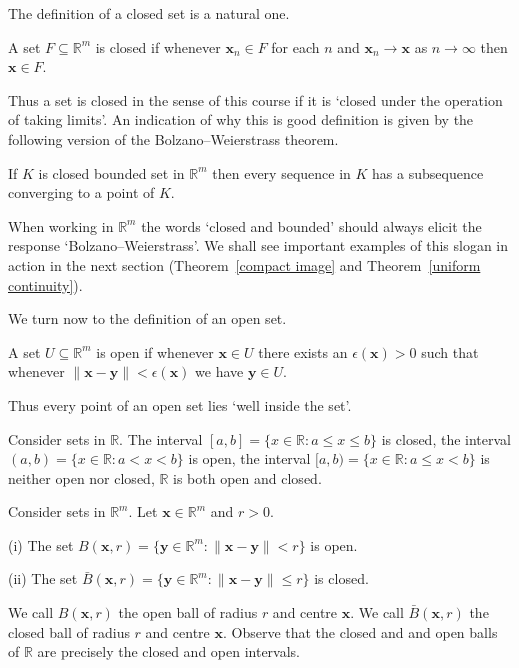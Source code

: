 The definition of a closed set is a natural one.
\begin{definition} A set $F\subseteq{\mathbb R}^{m}$
is closed if whenever $\mathbf{x}_{n}\in F$ for each
$n$ and $\mathbf{x}_{n}\rightarrow \mathbf{x}$
as $n\rightarrow\infty$ then $\mathbf{x}\in F$.
\end{definition}
Thus a set is closed in the sense of this course if
it is `closed under the operation of taking limits'.
An indication of why this is good definition is given
by the following version of the Bolzano--Weierstrass
theorem.
\begin{theorem} If $K$ is closed bounded set in
${\mathbb R}^{m}$ then every sequence in $K$ has
a subsequence converging to a point of $K$.
\end{theorem}
When working in ${\mathbb R}^{m}$ the words
`closed and bounded' should always elicit
the response `Bolzano--Weierstrass'. We shall
see important examples of this slogan in action
in the next section (Theorem~\ref{compact image}
and Theorem~\ref{uniform continuity}).

We turn now to the definition of an open set.
\begin{definition} A set $U\subseteq{\mathbb R}^{m}$
is open if whenever $\mathbf{x}\in U$ there exists
an $\epsilon({\mathbf x})>0$ such that whenever
$\|\mathbf{x}-\mathbf{y}\|<\epsilon({\mathbf x})$ we
have $\mathbf{y}\in U$.
\end{definition}
Thus every point of an open set lies `well inside the set'.
\begin{example} Consider sets in ${\mathbb R}$.
The interval $[a,b]=\{x\in{\mathbb R}:a\leq x \leq b\}$ is closed, 
the interval $(a,b)=\{x\in{\mathbb R}:a< x <b\}$ is open,
the interval $[a,b)=\{x\in{\mathbb R}:a\leq x <b\}$ is 
neither open nor closed, ${\mathbb R}$ is both open and
closed.
\end{example}
\begin{example} Consider sets in ${\mathbb R}^{m}$. Let
${\mathbf x}\in{\mathbb R}^{m}$ and $r>0$. 

(i) The set $B({\mathbf x},r)
=\{\mathbf{y}\in{\mathbb R}^{m}:
\|\mathbf{x}-\mathbf{y}\|<r\}$ is open.

(ii) The set $\bar{B}({\mathbf x},r)
=\{\mathbf{y}\in{\mathbb R}^{m}:
\|\mathbf{x}-\mathbf{y}\|\leq r\}$ is closed.
\end{example}
We call $B({\mathbf x},r)$ the open ball of radius $r$
and centre ${\mathbf x}$.
We call $\bar{B}({\mathbf x},r)$ the closed ball of radius $r$
and centre ${\mathbf x}$. Observe that the closed and and open
balls of ${\mathbb R}$ are precisely the closed
and open intervals.

